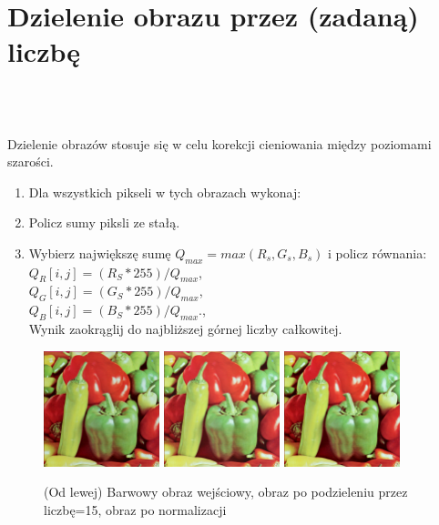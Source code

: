 \documentclass[final,a4paper,openany,12pt]{mwbk}
\begin{document}
\section{ Dzielenie obrazu przez (zadaną) liczbę}

\hfill
\\\\
\indent

Dzielenie obrazów stosuje się w celu korekcji cieniowania między poziomami szarości.

\begin{enumerate}	
		
		\item Dla wszystkich pikseli w tych obrazach wykonaj:
		\item Policz sumy piksli ze stałą.
		\item Wybierz największę sumę  $Q_{max} = max(R_{s}, G_{s}, B_{s})$ i policz równania:\\
		$Q_{R}[i,j] = (R_{S} * 255)/Q_{max}$,\\
		$Q_{G}[i,j] = (G_{S} * 255)/Q_{max}$,\\
		$Q_{B}[i,j] = (B_{S} * 255)/Q_{max}$.,\\
		Wynik zaokrąglij do najbliższej górnej liczby całkowitej.
	\end{enumerate}

\begin{figure}[H]
	\begin{center}
		\includegraphics[width=0.3\textwidth]{1/1Color_Div_Original}
		\includegraphics[width=0.3\textwidth]{1/1Color_Div_Result}
		\includegraphics[width=0.3\textwidth]{1/1Color_Div_Result_Norm}
	\end{center}
	\caption{(Od lewej) Barwowy obraz wejściowy, obraz po podzieleniu przez liczbę=15, obraz po normalizacji }
\end{figure}
\end{document}
